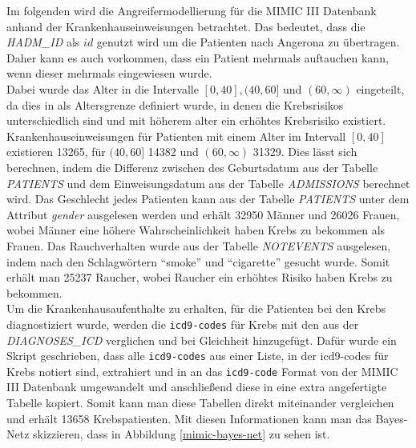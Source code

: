 \documentclass[german,version-2020-11]{uzl-thesis}
\begin{document}
Im folgenden wird die Angreifermodellierung für die MIMIC III Datenbank anhand der Krankenhauseinweisungen betrachtet. Das bedeutet, dass die \textit{HADM\_ID} als $id$ genutzt wird um die Patienten nach Angerona zu übertragen. Daher kann es auch vorkommen, dass ein Patient mehrmals auftauchen kann, wenn dieser mehrmals eingewiesen wurde.\\ 
Dabei wurde das Alter in die Intervalle $[0,40], (40,60]$ und $(60,\infty)$ eingeteilt, da dies in \cite{13} als Altersgrenze definiert wurde, in denen die Krebsrisikos unterschiedlich sind und mit höherem alter ein erhöhtes Krebsrisiko existiert. Krankenhauseinweisungen für Patienten mit einem Alter im Intervall $[0,40]$ existieren 13265, für $(40,60]$ 14382 und $(60,\infty)$ 31329. Dies lässt sich berechnen, indem die Differenz zwischen des Geburtsdatum aus der Tabelle \textit{PATIENTS} und dem Einweisungsdatum aus der Tabelle \textit{ADMISSIONS} berechnet wird.
Das Geschlecht jedes Patienten kann aus der Tabelle \textit{PATIENTS} unter dem Attribut \textit{gender} ausgelesen werden und erhält 32950 Männer und 26026 Frauen, wobei Männer eine höhere Wahrscheinlichkeit haben Krebs zu bekommen als Frauen. Das Rauchverhalten wurde aus der Tabelle \textit{NOTEVENTS} ausgelesen, indem nach den Schlagwörtern \enquote{smoke} und \enquote{cigarette} gesucht wurde. Somit erhält man 25237 Raucher, wobei Raucher ein erhöhtes Risiko haben Krebs zu bekommen. \\
Um die Krankenhausaufenthalte zu erhalten, für die Patienten bei den  Krebs diagnostiziert wurde, werden die \texttt{icd9-codes} für Krebs \cite{16} mit den aus der \textit{DIAGNOSES\_ICD} verglichen und bei Gleichheit hinzugefügt. Dafür wurde ein Skript geschrieben, dass alle \texttt{icd9-codes} aus einer Liste, in der icd9-codes für Krebs notiert sind, extrahiert und in an das \texttt{icd9-code} Format von der MIMIC III Datenbank umgewandelt und anschließend diese in eine extra angefertigte Tabelle kopiert. Somit kann man diese Tabellen direkt miteinander vergleichen und erhält 13658 Krebspatienten. 
Mit diesen Informationen kann man das Bayes-Netz skizzieren, dass in Abbildung \ref{mimic-bayes-net} zu sehen ist.\\
\end{document}
